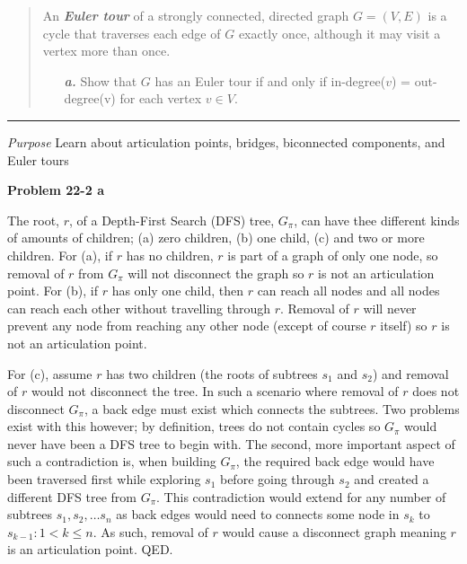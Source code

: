 \documentclass{article}
\newcommand\separator{\rule{\textwidth}{.2pt}}  %
\begin{document}
\begin{framed}
\begin{itemize}
\begin{quote}
            An \textbf{\textit{Euler tour}} of a strongly connected, directed 
            graph $G = (V, E)$ is a cycle that traverses each edge of $G$ 
            exactly once, although it may visit a vertex more than once. 
            \begin{enumerate}
                \item[\textbf{\textit{a.}}] Show that $G$ has an Euler tour if 
                    and only if in-degree($v$) = out-degree(v) for each vertex 
                    $v \in V$. 
            \end{enumerate}
        \end{quote}
    \end{itemize} 

    \separator
    
    \textit{Purpose} Learn about articulation points, bridges, biconnected 
    components, and Euler tours

\end{framed}



\textbf{Problem 22-2 a} 

The root, $r$, of a Depth-First Search (DFS) tree, $G_\pi$, can have thee 
different kinds of amounts of children; (a) zero children, (b) one child, (c) 
and two or more children. For (a), if $r$ has no children, $r$ is part of a 
graph of only one node, so removal of $r$ from $G_\pi$ will not disconnect the 
graph so $r$ is not an articulation point. For (b), if $r$ has only one child, 
then $r$ can reach all nodes and all nodes can reach each other without 
travelling through $r$. Removal of $r$ will never prevent any node from reaching
any other node (except of course $r$ itself) so $r$ is not an articulation 
point. 

For (c), assume $r$ has two children (the roots of subtrees $s_1$ and $s_2$) and
removal of $r$ would not disconnect the tree. In such a scenario where removal 
of $r$ does not disconnect $G_\pi$, a back edge must exist which connects the 
subtrees. Two problems exist with this however; by definition, trees do not 
contain cycles so $G_\pi$ would never have been a DFS tree to begin with. The 
second, more important aspect of such a contradiction is, when building $G_\pi$,
the required back edge would have been traversed first while exploring $s_1$ 
before going through $s_2$ and created a different DFS tree from $G_\pi$. This 
contradiction would extend for any number of subtrees $s_1, s_2, \ldots s_n$ as 
back edges would need to connects some node in $s_k$ to $s_{k-1}: 1 < k \le n$. 
As such, removal of $r$ would cause a disconnect graph meaning $r$ is an 
articulation point. QED. 
\end{document}
